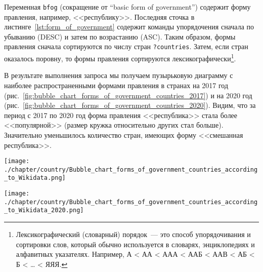 Переменная \lstinline|bfog| (сокращение от ``basic form of government'') содержит форму правления, например, <<республику>>. 
Последняя сточка в листинге~\ref{lst:form_of_government} содержит команды упорядочения 
сначала по убыванию (DESC) и затем по возрастанию (ASC). 
Таким образом, формы правления сначала сортируются по числу стран \lstinline|?countries|. 
Затем, если стран оказалось поровну, то формы правления сортируются лексикографически\footnote{%
%
Лексикографический (словарный) порядок~--- это способ упорядочивания и сортировки слов, 
который обычно используется в словарях, энциклопедиях и алфавитных указателях. 
Например, А < АА < ААА < ААБ < ААВ < АБ < Б < … < ЯЯЯ.%
}.

В результате выполнения запроса мы получаем пузырьковую диаграмму с наиболее распространенными формами правления в странах на 2017 год (рис.~\ref{fig:bubble_chart_forms_of_government_countries_2017}) и на 2020 год (рис.~\ref{fig:bubble_chart_forms_of_government_countries_2020}).
Видим, что за период с 2017 по 2020 год 
форма правления <<республика>> стала более <<популярной>> 
(размер кружка относительно других стал больше). 
Значительно уменьшилось количество стран, имеющих форму  <<смешанная республика>>.


\begin{fullwidth}
\noindent\begin{minipage}[]{.484\linewidth}
    \centering
	    \texttt{[image: ./chapter/country/Bubble\_chart\_forms\_of\_government\_countries\_according\_to\_Wikidata.png]}
	    \label{fig:bubble_chart_forms_of_government_countries_2017}%
\end{minipage}%
\hfill
\begin{minipage}[]{.46\linewidth}
    \centering
	\texttt{[image: ./chapter/country/Bubble\_chart\_forms\_of\_government\_countries\_according\_to\_Wikidata\_2020.png]}
	\label{fig:bubble_chart_forms_of_government_countries_2020}%
\end{minipage}
\end{fullwidth}%


